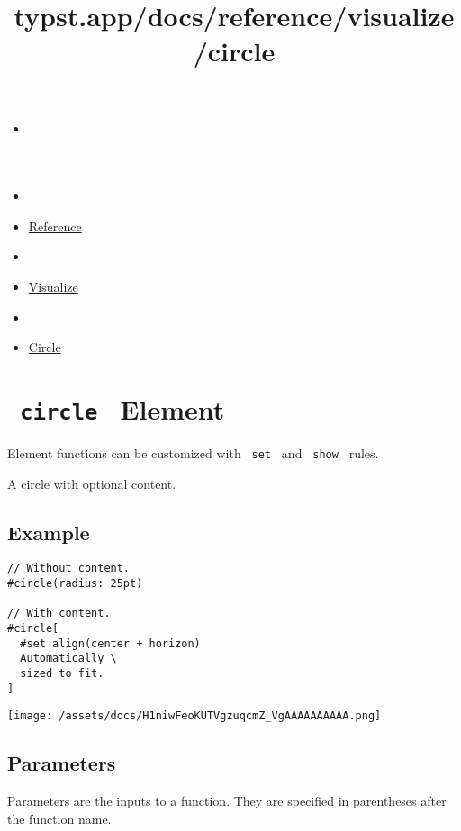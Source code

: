 \title{typst.app/docs/reference/visualize/circle}

\begin{itemize}
\tightlist
\item
  \href{/docs}{}
\item
  
\item
  \href{/docs/reference/}{Reference}
\item
  
\item
  \href{/docs/reference/visualize/}{Visualize}
\item
  
\item
  \href{/docs/reference/visualize/circle/}{Circle}
\end{itemize}

\section{\texorpdfstring{\texttt{\ circle\ } {{ Element
}}}{ circle   Element }}\label{summary}

\label{element-tooltip}
Element functions can be customized with \texttt{\ set\ } and
\texttt{\ show\ } rules.

A circle with optional content.

\subsection{Example}\label{example}

\begin{verbatim}
// Without content.
#circle(radius: 25pt)

// With content.
#circle[
  #set align(center + horizon)
  Automatically \
  sized to fit.
]
\end{verbatim}

\texttt{[image: /assets/docs/H1niwFeoKUTVgzuqcmZ\_VgAAAAAAAAAA.png]}

\subsection{\texorpdfstring{{ Parameters
}}{ Parameters }}\label{parameters}

\label{parameters-tooltip}
Parameters are the inputs to a function. They are specified in
parentheses after the function name.

